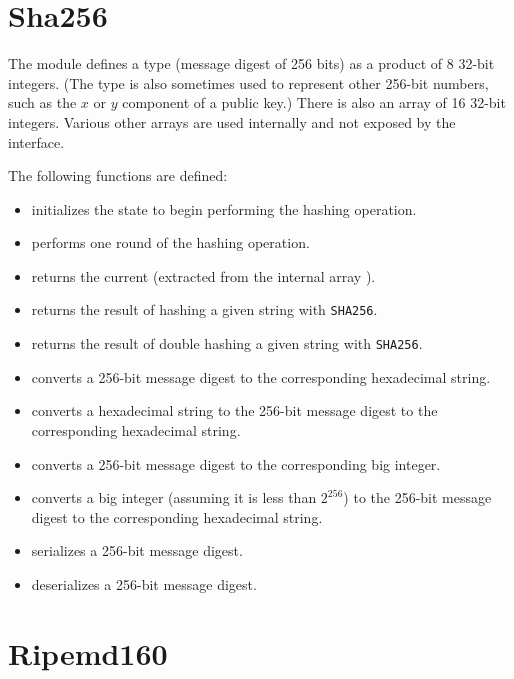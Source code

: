 \section{Sha256}

The module {} defines a type {} (message digest of 256 bits)
as a product of 8 32-bit integers.
(The type {} is also sometimes used to represent other 256-bit numbers, such as the
$x$ or $y$ component of a public key.)
There is also an array {} of 16 32-bit integers.
Various other arrays are used internally and not exposed by the interface.

The following functions are defined:

\begin{itemize}
\item {} initializes the state to begin performing the hashing operation.
\item {} performs one round of the hashing operation.
\item {} returns the current {} (extracted from the internal array {}).
\item {} returns the result of hashing a given string with {\tt{SHA256}}.
\item {} returns the result of double hashing a given string with {\tt{SHA256}}.
\item {} converts a 256-bit message digest to the corresponding hexadecimal string.
\item {} converts a hexadecimal string to the 256-bit message digest to the corresponding hexadecimal string.
\item {} converts a 256-bit message digest to the corresponding big integer.
\item {} converts a big integer (assuming it is less than $2^{256}$) to the 256-bit message digest to the corresponding hexadecimal string.
\item {} serializes a 256-bit message digest.
\item {} deserializes a 256-bit message digest.
\end{itemize}

\section{Ripemd160}

